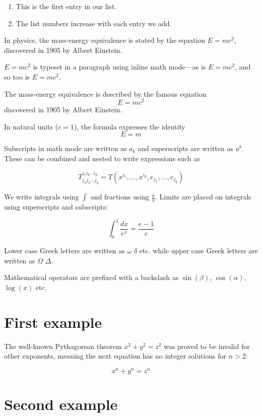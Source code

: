 \documentclass[11pt,a4paper]{article}
\begin{document}
\begin{enumerate}
    \item This is the first entry in our list.
    \item The list numbers increase with each entry we add.
\end{enumerate}


In physics, the mass-energy equivalence is stated
by the equation $E=mc^2$, discovered in 1905 by Albert Einstein.


\begin{math}
    E=mc^2
\end{math} is typeset in a paragraph using inline math mode---as is $E=mc^2$, and so too is \(E=mc^2\).

The mass-energy equivalence is described by the famous equation
\[ E=mc^2 \] discovered in 1905 by Albert Einstein.

In natural units ($c = 1$), the formula expresses the identity
\begin{equation}
    E=m
\end{equation}


Subscripts in math mode are written as $a_b$ and superscripts are written as $a^b$. These can be combined and nested to write expressions such as

\[ T^{i_1 i_2 \dots i_p}_{j_1 j_2 \dots j_q} = T(x^{i_1},\dots,x^{i_p},e_{j_1},\dots,e_{j_q}) \]

We write integrals using $\int$ and fractions using $\frac{a}{b}$. Limits are placed on integrals using superscripts and subscripts:

\[ \int_0^1 \frac{dx}{e^x} =  \frac{e-1}{e} \]

Lower case Greek letters are written as $\omega$ $\delta$ etc. while upper case Greek letters are written as $\Omega$ $\Delta$.

Mathematical operators are prefixed with a backslash as $\sin(\beta)$, $\cos(\alpha)$, $\log(x)$ etc.

\section{First example}

The well-known Pythagorean theorem \(x^2 + y^2 = z^2\) was proved to be invalid for other exponents, meaning the next equation has no integer solutions for \(n>2\):

\[ x^n + y^n = z^n \]

\section{Second example}
\end{document}
